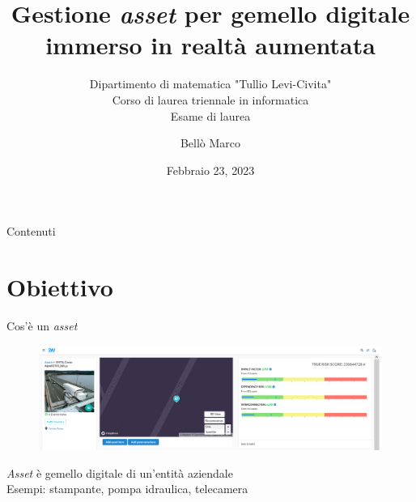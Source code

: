 \documentclass{beamer}
\title[Gestione \textit{asset} AR]{Gestione \textit{asset} per gemello digitale immerso in realtà aumentata}
\subtitle{Dipartimento di matematica "Tullio Levi-Civita" \\ Corso di laurea triennale in informatica\\ Esame di laurea}
\author{Bellò Marco}
\date{Febbraio 23, 2023}
\begin{document}
	\maketitle

	\begin{frame}{Contenuti}
		\tableofcontents
	\end{frame}


	\section{Obiettivo}
 
	\begin{frame}{Cos'è un \textit{asset}}
 \begin{figure}[H]
    \centering
    \includegraphics[width=\textwidth]{immagini/cos_e_un_asset.png}
\end{figure}
\centering
\textit{Asset} è gemello digitale di un'entità aziendale \\ \vspace{.5em}
Esempi: stampante, pompa idraulica, telecamera

	\end{frame}
\end{document}
